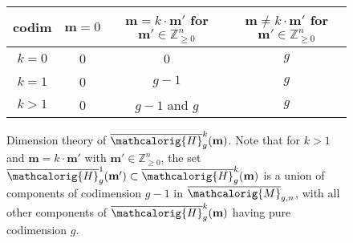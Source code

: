 \documentclass[11pt]{article}
\newcommand{\M}{\ensuremath{\overline{\mathcalorig{M}}}}
\begin{document}
\begin{figure}[ht]
\begin{center}
\begin{threeparttable}[b]
    \begin{tabular}{c|c|c|c}
    codim & $\textbf{m}=0$ & $\textbf{m}=k \cdot \textbf{m}'$ for $\textbf{m}' \in \mathbb{Z}^n_{\geq 0}$ & $\textbf{m} \neq k \cdot \textbf{m}'$ for $\textbf{m}' \in \mathbb{Z}^n_{\geq 0}$ \\ \hline
    $k=0$ & 0 & 0 & $g$\\
    $k=1$ & 0 & $g-1$ & $g$\\
    $k>1$ & 0 & $g-1$ and $g$ & $g$
    \end{tabular}

\end{threeparttable}
    \end{center}
\caption{Dimension theory of $\overline{\mathcalorig{H}}_g^k(\textbf{m})$. Note that for $k>1$ and $\textbf{m}=k \cdot \textbf{m}'$ with  $\textbf{m}' \in \mathbb{Z}^n_{\geq 0}$, the set $\overline{\mathcalorig{H}}_g^1(\textbf{m}') \subset \overline{\mathcalorig{H}}_g^k(\textbf{m})$ is a union of components of codimension $g-1$ in $\M_{g,n}$, with all other components of $\overline{\mathcalorig{H}}_g^k(\textbf{m})$ having pure codimension $g$.}
\end{figure}
\end{document}

